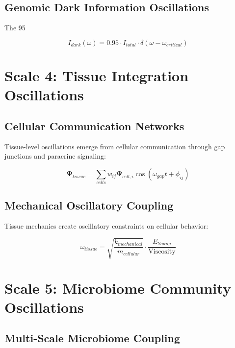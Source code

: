 \documentclass[twocolumn]{article}
\begin{document}
\subsection{Genomic Dark Information Oscillations}

The 95%

\begin{equation}
I_{dark}(\omega) = 0.95 \cdot I_{total} \cdot \delta(\omega - \omega_{critical})
\end{equation}

\section{Scale 4: Tissue Integration Oscillations}

\subsection{Cellular Communication Networks}

Tissue-level oscillations emerge from cellular communication through gap junctions and paracrine signaling:

\begin{equation}
\mathbf{\Psi}_{tissue} = \sum_{cells} w_{ij} \mathbf{\Psi}_{cell,i} \cos(\omega_{gap}t + \phi_{ij})
\end{equation}

\subsection{Mechanical Oscillatory Coupling}

Tissue mechanics create oscillatory constraints on cellular behavior:

\begin{equation}
\omega_{tissue} = \sqrt{\frac{k_{mechanical}}{m_{cellular}}} \cdot \frac{E_{Young}}{\text{Viscosity}}
\end{equation}

\section{Scale 5: Microbiome Community Oscillations}

\subsection{Multi-Scale Microbiome Coupling}
\end{document}
